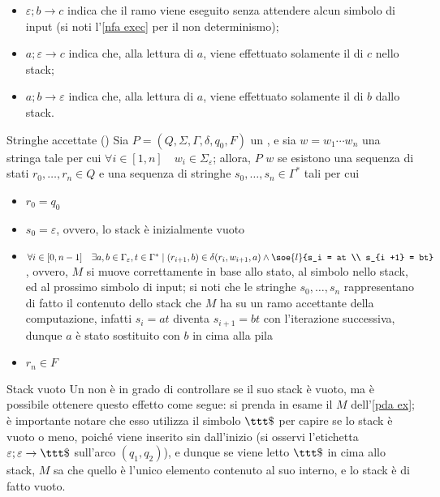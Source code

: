 \documentclass[a4paper, 12pt]{report}
\begin{document}
\begin{example}[\PDA]
        \begin{itemize}
            \item $\varepsilon; b \to c$ indica che il ramo viene eseguito senza attendere alcun simbolo di input (si noti l'\cref{nfa exec} per il non determinismo);
            \item $a; \varepsilon \to c$ indica che, alla lettura di $a$, viene effettuato solamente il  di $c$ nello stack;
            \item $a; b \to \varepsilon$ indica che, alla lettura di $a$, viene effettuato solamente il  di $b$ dallo stack.
        \end{itemize}
    \end{example}

    \begin{frameddefn}{Stringhe accettate (\PDA)}
        Sia $P = (Q, \Sigma, \Gamma, \delta, q_0, F)$ un \PDA, e sia $w = w_1\cdots w_n$ una stringa tale per cui $\forall i \in [1, n] \quad w_i \in \Sigma_\varepsilon$; allora, $P$  $w$ se esistono una sequenza di stati $r_0, \ldots, r_n \in Q$ e una sequenza di stringhe $s_0, \ldots, s_n \in \Gamma ^*$ tali per cui

        \begin{itemize}
            \item $r_0 = q_0$
            \item $s_0 = \varepsilon$, ovvero, lo stack è inizialmente vuoto
            \item $\forall i \in [0, n - 1] \quad \exists a, b \in \Gamma_\varepsilon, t \in \Gamma^* \mid (r_{i + 1}, b) \in \delta(r_i, w_{i + 1}, a) \land \soe{l}{s_i = at \\ s_{i +1} = bt}$, ovvero, $M$ si muove correttamente in base allo stato, al simbolo nello stack, ed al prossimo simbolo di input; si noti che le stringhe $s_0, \ldots, s_n$ rappresentano di fatto il contenuto dello stack che $M$ ha su un ramo accettante della computazione, infatti $s_i = at$ diventa $s_{i + 1} = bt$ con l'iterazione successiva, dunque $a$ è stato sostituito con $b$ in cima alla pila
            \item $r_n \in F$
        \end{itemize}
    \end{frameddefn}

    \begin{framedobs}[label={pda empty stack}]{Stack vuoto}
        Un \PDA non è in grado di controllare se il suo stack è vuoto, ma è possibile ottenere questo effetto come segue: si prenda in esame il \PDA $M$ dell'\cref{pda ex}; è importante notare che esso utilizza il simbolo $\ttt \$$ per capire se lo stack è vuoto o meno, poiché viene inserito sin dall'inizio (si osservi l'etichetta $\varepsilon; \varepsilon \to \ttt \$$ sull'arco $(q_1, q_2)$), e dunque se viene letto $\ttt \$$ in cima allo stack, $M$ sa che quello è l'unico elemento contenuto al suo interno, e lo stack è di fatto vuoto.
    \end{framedobs}
\end{document}

